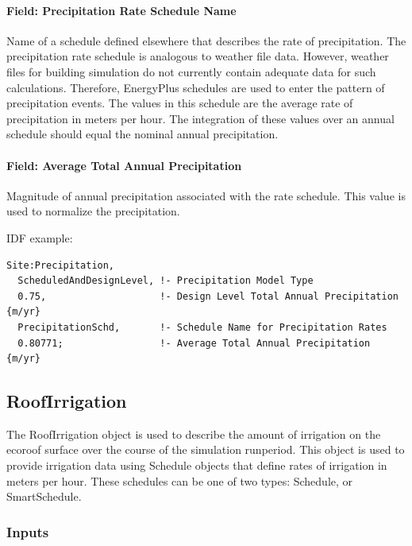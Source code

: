 \paragraph{Field: Precipitation Rate Schedule Name}\label{field-precipitation-rate-schedule-name}

Name of a schedule defined elsewhere that describes the rate of precipitation. The precipitation rate schedule is analogous to weather file data. However, weather files for building simulation do not currently contain adequate data for such calculations. Therefore, EnergyPlus schedules are used to enter the pattern of precipitation events. The values in this schedule are the average rate of precipitation in meters per hour. The integration of these values over an annual schedule should equal the nominal annual precipitation.

\paragraph{Field: Average Total Annual Precipitation}\label{field-average-total-annual-precipitation}

Magnitude of annual precipitation associated with the rate schedule. This value is used to normalize the precipitation.

IDF example:

\begin{lstlisting}
Site:Precipitation,
  ScheduledAndDesignLevel, !- Precipitation Model Type
  0.75,                    !- Design Level Total Annual Precipitation {m/yr}
  PrecipitationSchd,       !- Schedule Name for Precipitation Rates
  0.80771;                 !- Average Total Annual Precipitation {m/yr}
\end{lstlisting}

\subsection{RoofIrrigation}\label{roofirrigation}

The RoofIrrigation object is used to describe the amount of irrigation on the ecoroof surface over the course of the simulation runperiod. This object is used to provide irrigation data using Schedule objects that define rates of irrigation in meters per hour. These schedules can be one of two types: Schedule, or SmartSchedule.

\subsubsection{Inputs}\label{inputs-23-002}

